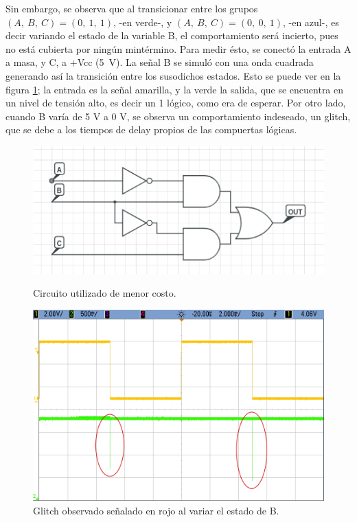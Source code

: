 Sin embargo, se observa que al transicionar entre los grupos $(A,~B,~C)=(0,~1,~1)$, -en verde-, y $(A,~B,~C)=(0,~0,~1)$, -en azul-, es decir variando el estado de la variable B, el comportamiento será incierto, pues no está cubierta por ningún mintérmino.
Para medir ésto, se conectó la entrada A a masa, y C, a +Vcc (5~V). La señal B se simuló con una onda cuadrada generando 
así la transición entre los susodichos estados. Esto se puede ver en la figura \ref{fig:glitch}; la entrada es la señal amarilla, y la verde la salida, que se encuentra en un nivel de tensión alto, es decir un 1 lógico, como era de esperar. 
Por otro lado, cuando B varía de 5 V a 0 V, se observa un comportamiento indeseado, un glitch, que se debe a los tiempos de delay propios de las compuertas lógicas.

\vspace{5mm}
\begin{figure}[H]
    \begin{minipage}{.49\linewidth}
        \centering
        \vspace{10mm}
        \includegraphics[width=.8\linewidth]{./circconglitches.jpg}
        \vspace{10mm}
        \caption{Circuito utilizado de menor costo.}
        \label{fig:circuito-con-glitches}
    \end{minipage}
    \begin{minipage}{.5\linewidth}
        \centering
        \includegraphics[width=\linewidth]{./glitch.png}
        \caption{Glitch observado señalado en rojo al variar el estado de B.}
        \label{fig:glitch}
    \end{minipage}
\end{figure}

